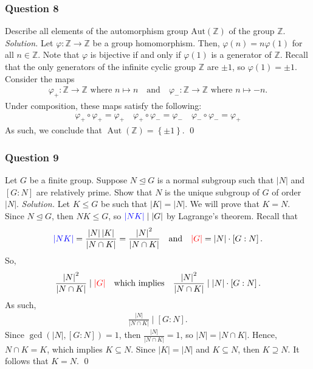 \documentclass[12pt]{article}
\begin{document}
\subsubsection*{Question 8}
Describe all elements of the automorphism group $\mathrm{Aut}(\mathbb{Z})$ of the group $\mathbb{Z}$.
\newline
\newline\textit{Solution.} Let $\varphi:\mathbb{Z}\to\mathbb{Z}$ be a group homomorphism. Then, $\varphi\left(n\right)=n\varphi\left(1\right)$ for all $n\in\mathbb{Z}$. Note that $\varphi$ is bijective if and only if $\varphi\left(1\right)$ is a generator of $\mathbb{Z}$. Recall that the only generators of the infinite cyclic group $\mathbb{Z}$ are $\pm 1$, so $\varphi\left(1\right)=\pm 1$. Consider the maps \begin{align*}
    \varphi_+:\mathbb{Z}\to\mathbb{Z}\text{ where }n\mapsto n\quad\text{and}\quad \varphi_-:\mathbb{Z}\to\mathbb{Z}\text{ where }n\mapsto -n.
\end{align*}
Under composition, these maps satisfy the following: \begin{align*}
    \varphi_+\circ \varphi_+=\varphi_+\quad \varphi_+\circ \varphi_-=\varphi_-\quad \varphi_-\circ \varphi_-=\varphi_+
\end{align*}
As such, we conclude that $\operatorname{Aut}\left(\mathbb{Z}\right)=\left\{\pm 1\right\}$. \qed 
\subsubsection*{Question 9}
Let $G$ be a finite group. Suppose $N\unlhd G$ is a normal subgroup such that $|N|$ and $[G:N]$ are relatively prime. Show that $N$ is the unique subgroup of $G$ of order $|N|$.
\newline
\newline\textit{Solution.} Let $K\le G$ be such that $\left|K\right|=\left|N\right|$. We will prove that $K=N$. Since $N\unlhd G$, then $NK\le G$, so $\textcolor{blue}{\left|NK\right|}\mid \left|G\right|$ by Lagrange's theorem. Recall that \begin{align*}
    \textcolor{blue}{\left|NK\right|}=\frac{\left|N\right|\left|K\right|}{\left|N\cap K\right|}=\frac{\left|N\right|^2}{\left|N\cap K\right|}\quad\text{and}\quad \textcolor{red}{\left|G\right|}=\left|N\right|\cdot \left[G:N\right].
\end{align*}
So, \begin{align*}
    \frac{\left|N\right|^2}{\left|N\cap K\right|}\mid \textcolor{red}{\left|G\right|}\quad\text{which implies}\quad \frac{\left|N\right|^2}{\left|N\cap K\right|}\mid \left|N\right|\cdot \left[G:N\right].
\end{align*}
As such, \begin{align*}
    \frac{\left|N\right|}{\left|N\cap K\right|}\mid \left[G:N\right].
\end{align*}
Since $\operatorname{gcd}\left(\left|N\right|,\left[G:N\right]\right)=1$, then $\frac{\left|N\right|}{\left|N\cap K\right|}=1$, so $\left|N\right|=\left|N\cap K\right|$. Hence, $N\cap K=K$, which implies $K\subseteq N$. Since $\left|K\right|=\left|N\right|$ and $K\subseteq N$, then $K\supseteq N$. It follows that $K=N$. \qed 
\newpage
\end{document}
